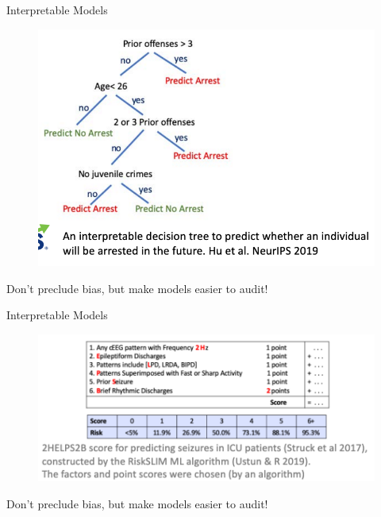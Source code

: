 \documentclass[11pt]{beamer}
\begin{document}
\begin{frame}[c]{Interpretable Models}
\begin{figure}
  \centering
\pause \includegraphics[width=\textwidth]{images/rudin_model_compas.png}
\end{figure}
\pause Don't preclude bias, but make models easier to audit!
\end{frame}

\begin{frame}[c]{Interpretable Models}
\begin{figure}
  \centering
\pause \includegraphics[width=\textwidth]{images/rudin_model_seizure.png}
\end{figure}
\pause Don't preclude bias, but make models easier to audit!
\end{frame}
\end{document}

